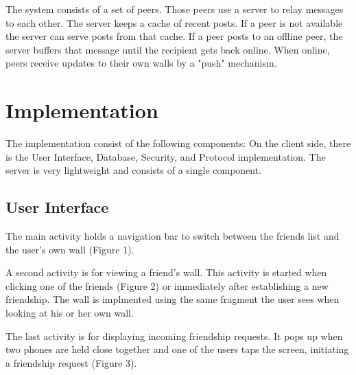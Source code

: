 \documentclass{report}
\begin{document}
The system consists of a set of peers. Those peers use a server to relay messages to each other. The server keeps a cache of recent posts. If a peer is not available the server can serve posts from that cache. If a peer posts to an offline peer, the server buffers that message until the recipient gets back online. When online, peers receive 
updates to their own walls by a "push" mechanism.

\section{Implementation}

The implementation consist of the following components: On the client side, there is the User Interface, Database, Security, and Protocol implementation. The server is very lightweight and consists of a single component.

\subsection{User Interface}

The main activity holds a navigation bar to switch between the friends list and the user's own wall (Figure 1).

A second activity is for viewing a friend's wall. This activity is started when clicking one of the friends (Figure 2) or immediately after establishing a new friendship. The wall is implmented using the same fragment the user sees when looking at his or her own wall.\newline

The last activity is for displaying incoming friendship requests. It pops up when two phones are held close together and one of the users taps the screen, initiating a friendship request (Figure 3).
\end{document}
